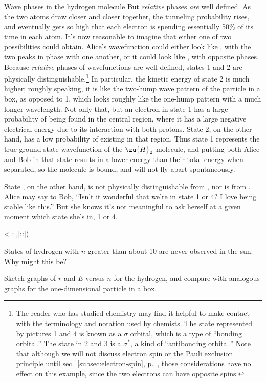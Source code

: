 \begin{eg}{Wave phases in the hydrogen molecule}
But \emph{relative} phases \emph{are} well defined. As the two atoms draw closer and closer together,
the tunneling probability rises, and eventually gets so high that each electron is spending essentially
50\% of its time in each atom. It's now reasonable to imagine that either one of two possibilities could
obtain. Alice's wavefunction could either look like , with the two peaks in
phase with one another, or it could look like , with opposite phases. Because
\emph{relative} phases of wavefunctions are well defined, states 1 and 2 are physically 
distinguishable.\footnote{The reader who has studied chemistry may find it helpful to make contact
with the terminology and notation used by chemists. The state represented by
pictures 1 and 4 is known as a
$\sigma$ orbital, which is a type of ``bonding orbital.'' The state in 2 and 3 is a $\sigma^*$, a kind of
``antibonding orbital.'' Note that although we will not discuss electron spin or the Pauli exclusion
principle until sec.~\ref{subsec:electron-spin}, p.~\pageref{subsec:electron-spin}, those considerations
have no effect on this example, since the two electrons can have opposite spins.}
In particular, the kinetic energy of state 2 is much higher; roughly speaking, it is like the two-hump
wave pattern of the particle in a box, as opposed to 1, which looks roughly like the one-hump pattern
with a much longer wavelength. Not only that, but an electron in state 1 has a large probability of being found in the
central region, where it has a large negative electrical energy due to its interaction with both protons.
State 2, on the other hand, has a low probability of existing in that region. Thus state 1 represents the
true ground-state wavefunction of the $\zu{H}_2$ molecule, and putting both Alice and Bob in that state
results in a lower energy than their total energy when separated, so the molecule is bound, and will not
fly apart spontaneously.

State , on the other hand, is not physically distinguishable from ,
nor is  from . Alice may say to Bob, ``Isn't it wonderful that
we're in state 1 or 4? I love being stable like this.'' But she knows it's not meaningful to ask herself
at a given moment which state she's in, 1 or 4.
\end{eg}


<%
:],[::])

\startdqs

\begin{dq}
States of hydrogen with $n$ greater than about 10 are
never observed in the sun. Why might this be?
\end{dq}

\begin{dq}
Sketch graphs of $r$ and $E$ versus $n$ for the hydrogen,
and compare with analogous graphs for the one-dimensional particle in a box.
\end{dq}
